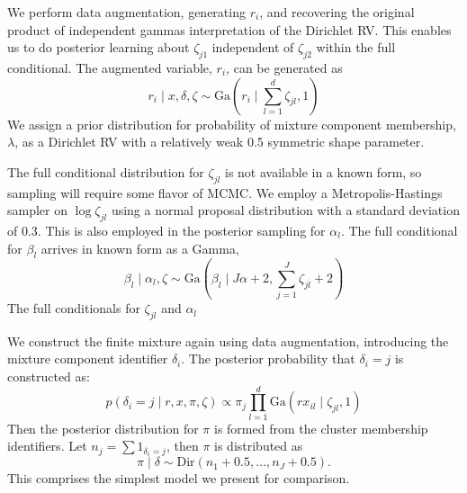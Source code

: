 We perform data augmentation, generating $r_i$, and recovering the original product of independent
  gammas interpretation of the Dirichlet RV.  This enables us to do posterior learning about
  $\zeta_{j1}$ independent of $\zeta_{j2}$ within the full conditional.  The augmented variable,
  $r_i$, can be generated as
  \begin{equation}
    \label{eq:L1augmentation}
    r_i\mid x, \delta, \zeta \sim \text{Ga}(r_i \mid \sum_{l = 1}^d \zeta_{jl}, 1)
  \end{equation}
  We assign a prior distribution for probability of mixture component membership, $\lambda$, as a
  Dirichlet RV with a relatively weak 0.5 symmetric shape parameter.

The full conditional distribution for $\zeta_{jl}$ is not available in a known form, so sampling
  will require some flavor of MCMC.  We employ a Metropolis-Hastings sampler on $\log\zeta_{jl}$
  using a normal proposal distribution with a standard deviation of 0.3.  This is also employed in
  the posterior sampling for $\alpha_l$. The full conditional for $\beta_l$ arrives in known form
  as a Gamma,
  \begin{equation}
    \label{eq:betafc}
    \beta_l\mid \alpha_l, \zeta \sim \text{Ga}(\beta_l \mid J\alpha + 2, \sum_{j = 1}^J\zeta_{jl} + 2)
  \end{equation}
  The full conditionals for $\zeta_{jl}$ and $\alpha_l$ 

We construct the finite mixture again using data augmentation, introducing the mixture component
  identifier $\delta_i$. The posterior probability that $\delta_i = j$ is constructed as:
  \begin{equation}
    \label{eq:finitemix}
    p(\delta_i = j \mid r, x, \pi, \zeta) \propto \pi_j\prod_{l = 1}^d\text{Ga}(rx_{il}\mid\zeta_{jl},1)
  \end{equation}
  Then the posterior distribution for $\pi$ is formed from the cluster membership identifiers.  Let
  $n_j = \sum 1_{\delta_i = j}$, then $\pi$ is distributed as
  \begin{equation}
    \pi \mid \delta \sim \text{Dir}(n_1 + 0.5, \ldots, n_J + 0.5).
  \end{equation}
  This comprises the simplest model we present for comparison.

